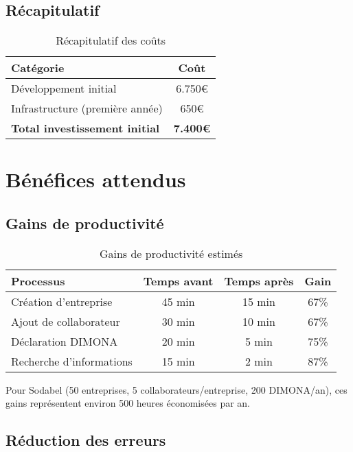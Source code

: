 \subsection{Récapitulatif}

\begin{table}[h]
\centering
\begin{tabular}{|l|c|}
\hline
\textbf{Catégorie} & \textbf{Coût} \\
\hline
Développement initial & 6.750€ \\
Infrastructure (première année) & 650€ \\
\hline
\textbf{Total investissement initial} & \textbf{7.400€} \\
\hline
\end{tabular}
\caption{Récapitulatif des coûts}
\end{table}

\section{Bénéfices attendus}

\subsection{Gains de productivité}

\begin{table}[h]
\centering
\begin{tabular}{|l|c|c|c|}
\hline
\textbf{Processus} & \textbf{Temps avant} & \textbf{Temps après} & \textbf{Gain} \\
\hline
Création d'entreprise & 45 min & 15 min & 67\% \\
Ajout de collaborateur & 30 min & 10 min & 67\% \\
Déclaration DIMONA & 20 min & 5 min & 75\% \\
Recherche d'informations & 15 min & 2 min & 87\% \\
\hline
\end{tabular}
\caption{Gains de productivité estimés}
\end{table}

Pour Sodabel (50 entreprises, 5 collaborateurs/entreprise, 200 DIMONA/an), ces gains représentent environ 500 heures économisées par an.

\subsection{Réduction des erreurs}

